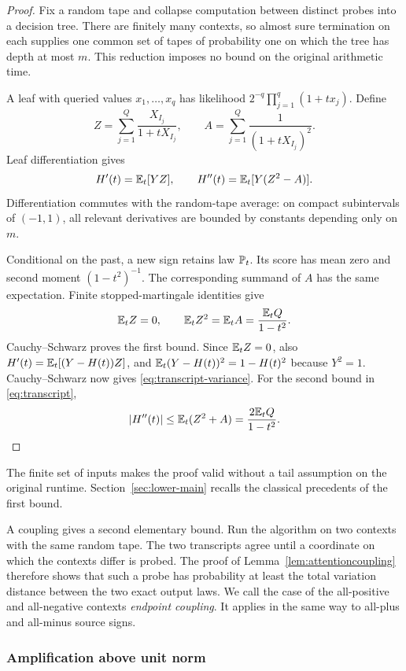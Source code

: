 \begin{proof}
Fix a random tape and collapse computation between distinct probes
into a decision tree. There are finitely many contexts, so almost
sure termination on each supplies one common set of tapes of
probability one on which the tree has depth at most \(m\).
This reduction imposes no bound on the original arithmetic time.

A leaf with queried values \(x_1,\dots,x_q\) has likelihood
\(2^{-q}\prod_{j=1}^q(1+tx_j)\).
Define
\[
Z=\sum_{j=1}^Q\frac{X_{I_j}}{1+tX_{I_j}},\qquad
A=\sum_{j=1}^Q\frac1{(1+tX_{I_j})^2}.
\]
Leaf differentiation gives
\[
H'(t)=\mathbb E_t[YZ],\qquad H''(t)=\mathbb E_t[Y(Z^2-A)].
\]
Differentiation commutes with the random-tape average: on compact
subintervals of \((-1,1)\), all relevant derivatives are bounded
by constants depending only on \(m\).

Conditional on the past, a new sign retains law \(\mathbb P_t\).
Its score has mean zero and second moment \((1-t^2)^{-1}\).
The corresponding summand of \(A\) has the same expectation.
Finite stopped-martingale identities give
\[
\mathbb E_tZ=0,\qquad \mathbb E_tZ^2=\mathbb E_tA=\frac{\mathbb E_tQ}{1-t^2}.
\]
Cauchy--Schwarz proves the first bound. Since \(\mathbb E_tZ=0\), also
\(H'(t)=\mathbb E_t[(Y-H(t))Z]\), and \(\mathbb E_t(Y-H(t))^2=1-H(t)^2\)
because \(Y^2=1\). Cauchy--Schwarz now gives
\eqref{eq:transcript-variance}. For the second bound in
\eqref{eq:transcript},
\[
|H''(t)|\le\mathbb E_t(Z^2+A)=\frac{2\mathbb E_tQ}{1-t^2}.
\]
\end{proof}

The finite set of inputs makes the proof valid without a tail
assumption on the original runtime. Section~\ref{sec:lower-main}
recalls the classical precedents of the first bound.

A coupling gives a second elementary bound. Run the algorithm on two
contexts with the same random tape. The two transcripts agree until
a coordinate on which the contexts differ is probed. The proof of
Lemma~\ref{lem:attentioncoupling} therefore shows that such a probe
has probability at least the total variation distance between the
two exact output laws. We call the case of the all-positive and
all-negative contexts \emph{endpoint coupling}. It applies in the
same way to all-plus and all-minus source signs.

\subsubsection{Amplification above unit norm}

